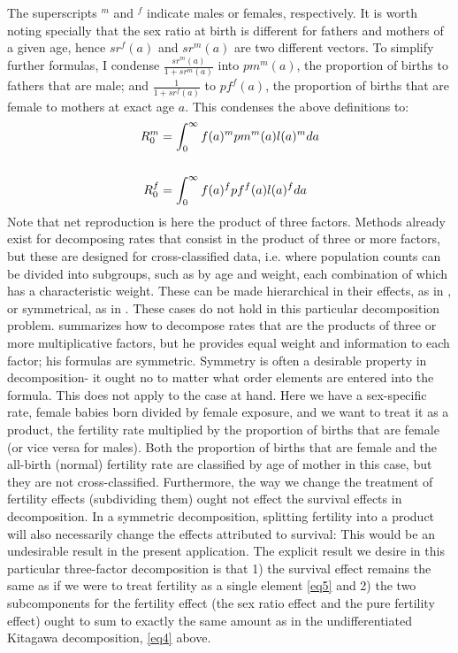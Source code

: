 \documentclass{article}
\begin{document}
The superscripts ${}^{m}$ and ${}^{f}$ indicate males or females, respectively. It is worth noting specially that the sex ratio at birth is different for fathers and mothers of a given age, hence $sr^{f}(a)$ and $sr^{m}(a)$ are two different vectors. To simplify further formulas, I condense $\frac{sr^{m}(a)}{1+sr^{m}(a)}$ into $pm^{m}(a)$, the proportion of births to fathers that are male; and $\frac{1}{1+sr^{f}(a)}$ to $pf^{f}(a)$, the proportion of births that are female to mothers at exact age $a$.
This condenses the above definitions to:
\begin{align}
R_{0}^{m} &= \int _{0}^{\infty} f(a)^{m}pm^{m}(a)l(a)^{m}da \notag \\ \notag \\
R_{0}^{f} &= \int _{0}^{\infty} f(a)^{f}pf^{f}(a)l(a)^{f}da \notag
\end{align}
Note that net reproduction is here the product of three factors. Methods already exist for decomposing rates that consist in the product of three or more factors, but these are designed for cross-classified data, i.e. where population counts can be divided into subgroups, such as by age and weight, each combination of which has a characteristic weight. These can be made hierarchical in their effects, as in \citet{kim1984decomposition}, or symmetrical, as in \citet{gupta1978general}. These cases do not hold in this particular decomposition problem. \citet{das1993standardization} summarizes how to decompose rates that are the products of three or more multiplicative factors, but he provides equal weight and information to each factor; his formulas are symmetric. Symmetry is often a desirable property in decomposition- it ought no to matter what order elements are entered into the formula. This does not apply to the case at hand. Here we have a sex-specific rate, female babies born divided by female exposure, and we want to treat it as a product, the fertility rate multiplied by the proportion of births that are female (or vice versa for males). Both the proportion of births that are female and the all-birth (normal) fertility rate are classified by age of mother in this case, but they are not cross-classified. Furthermore, the way we change the treatment of fertility effects (subdividing them) ought not effect the survival effects in decomposition. In a symmetric decomposition, splitting fertility into a product will also necessarily change the effects attributed to survival: This would be an undesirable result in the present application. The explicit result we desire in this particular three-factor decomposition is that 1) the survival effect remains the same as if we were to treat fertility as a single element \eqref{eq5} and 2) the two subcomponents for the fertility effect (the sex ratio effect and the pure fertility effect) ought to sum to exactly the same amount as in the undifferentiated Kitagawa decomposition, \eqref{eq4} above.
\end{document}

